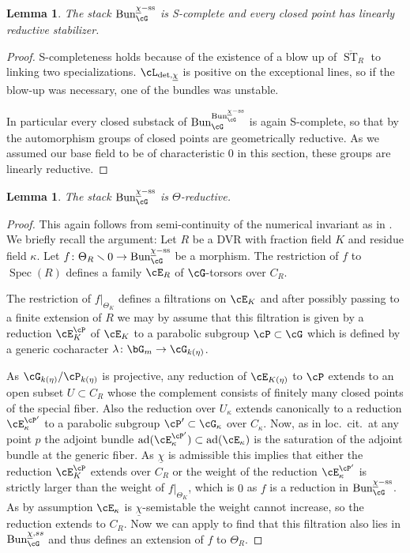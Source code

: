 \documentclass[a4paper]{amsart}
\numberwithin{equation}{section}
\theoremstyle{plain}
\newtheorem{lem}[thm]{Lemma}
\theoremstyle{definition}
\DeclareMathOperator{\Spec}{Spec}
\DeclareMathOperator{\ST}{ST}
\DeclareMathOperator{\Bun}{Bun}
\newcommand{\co}{\colon}
\renewcommand{\ss}{{\rm ss}}
\DeclareMathOperator{\ad}{ad}
\def\oST{\overline{\ST}}
\begin{document}
\begin{lem}\label{L:BunGScomplete}
	The stack $\Bun_{\cG}^{\underline{\chi}-\ss}$ is  {\textsf{S}}-complete and every closed point has linearly reductive stabilizer. 
\end{lem}
\begin{proof}
	 {\textsf{S}}-completeness holds because of the existence of a blow up of $\oST_R$ to linking two specializations. $\cL_{\det,\underline{\chi}}$ is positive on the exceptional lines, so  if the blow-up was necessary, one of the bundles was unstable.
	
	In particular every closed substack of $\Bun_{\cG}^{\Bun_{\cG}^{\underline{\chi}-\ss}}$ is again  {\textsf{S}}-complete, so that by  the automorphism groups of closed points are geometrically reductive. As we assumed our base field to be of characteristic $0$ in this section, these groups are linearly reductive.  
\end{proof}

\begin{lem}
The stack $\Bun_{\cG}^{\underline{\chi}-\ss}$ is $\Theta$-reductive.
\end{lem}
\begin{proof}
	This again follows from semi-continuity of the numerical invariant as in \cite[Lem. 3.17]{heinloth-stability}. We briefly recall the argument:
	Let $R$ be a DVR with fraction field $K$ and residue field $\kappa$. Let $f\co \Theta_R\smallsetminus 0 \to \Bun_{\cG}^{\underline{\chi}-\ss}$ be a morphism. The restriction of $f$ to $\Spec(R)$ defines a family $\cE_R$ of $\cG$-torsors over $C_R$.
	
	The restriction of $f|_{\Theta_K}$ defines a filtrations on $\cE_K$ and  
	after possibly passing to a finite extension of $R$ we may by \cite[Rem. 3.10]{heinloth-stability} assume that this filtration is given by a reduction $\cE^{\cP}_K$ of $\cE_K$ to a parabolic subgroup $\cP\subset \cG$ which is defined by a generic cocharacter $\lambda\co \bG_m \to \cG_{k(\eta)}$.
		
	As $\cG_{k(\eta)}/\cP_{k(\eta)}$ is projective, any reduction of $\cE_{K(\eta)}$ to $\cP$ extends to an open subset $U\subset C_R$ whose the complement consists of finitely many closed points of the special fiber. Also the reduction over $U_\kappa$ extends canonically to a reduction $\cE^{\cP^\prime}_{\kappa}$ to a parabolic subgroup $\cP^\prime\subset \cG_\kappa$ over $C_\kappa$. 
	Now, as in loc.\ cit.\  at any point $p$ the adjoint bundle $\ad(\cE^{\cP^\prime}_{\kappa}) \subset \ad(\cE_\kappa)$ is the saturation of the adjoint bundle at the generic fiber. As $\underline{\chi}$ is admissible this implies that either the reduction $\cE^{\cP}_K$ extends over $C_R$ or the weight of the reduction $\cE^{\cP^\prime}_{\kappa}$ is strictly larger than the weight of $f|_{\Theta_K}$, which is $0$ as $f$ is a reduction in $\Bun_{\cG}^{\underline{\chi}-\ss}$. As by assumption $\cE_\kappa$ is $\underline{\chi}$-semistable the weight cannot increase, so the reduction extends to $C_R$. Now we can apply  to find that this filtration also lies in $\Bun_{\cG}^{\underline{\chi},ss}$ and thus defines an extension of $f$ to $\Theta_R$.
\end{proof}
\end{document}

